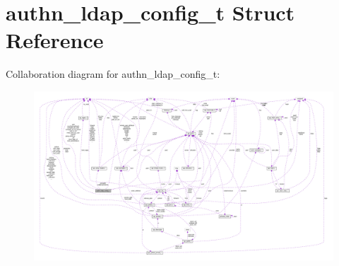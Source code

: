 \hypertarget{structauthn__ldap__config__t}{}\section{authn\+\_\+ldap\+\_\+config\+\_\+t Struct Reference}
\label{structauthn__ldap__config__t}


Collaboration diagram for authn\+\_\+ldap\+\_\+config\+\_\+t\+:
\nopagebreak
\begin{figure}[H]
\begin{center}
\leavevmode
\includegraphics[width=350pt]{structauthn__ldap__config__t__coll__graph}
\end{center}
\end{figure}
